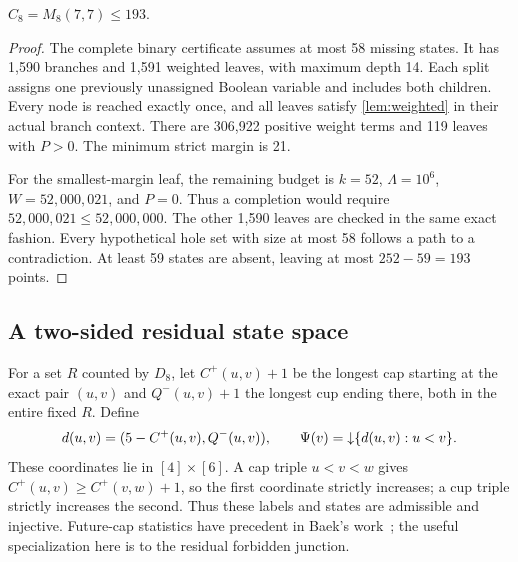 \begin{proposition}\label{prop:193}
$C_8=M_8(7,7)\le193$.
\end{proposition}
\begin{proof}
The complete binary certificate assumes at most 58 missing states.
It has 1,590 branches and 1,591 weighted leaves, with maximum depth
14. Each split assigns one previously unassigned Boolean variable
and includes both children. Every node is reached exactly once, and
all leaves satisfy \cref{lem:weighted} in their actual branch context.
There are 306,922 positive weight terms and 119 leaves with $P>0$.
The minimum strict margin is 21.

For the smallest-margin leaf, the remaining budget is $k=52$,
$\Lambda=10^6$, $W=52{,}000{,}021$, and $P=0$. Thus a completion would
require $52{,}000{,}021\le52{,}000{,}000$. The other 1,590 leaves
are checked in the same exact fashion. Every hypothetical hole set
with size at most 58 follows a path to a contradiction. At least 59
states are absent, leaving at most $252-59=193$ points.
\end{proof}

\subsection{A two-sided residual state space}
For a set $R$ counted by $D_8$, let $C^+(u,v)+1$ be the longest cap
starting at the exact pair $(u,v)$ and $Q^-(u,v)+1$ the longest cup
ending there, both in the entire fixed $R$. Define
\begin{equation}\label{eq:twosided}
 d(u,v)=(5-C^+(u,v),Q^-(u,v)),\qquad
 \Psi(v)=\mathord{\downarrow}\{d(u,v):u<v\}.
\end{equation}
These coordinates lie in $[4]\times[6]$. A cap triple $u<v<w$ gives
$C^+(u,v)\ge C^+(v,w)+1$, so the first coordinate strictly increases;
a cup triple strictly increases the second. Thus these labels and
states are admissible and injective. Future-cap statistics have
precedent in Baek's work~\cite[Theorem~3.2 and Definition~3.4]{Baek};
the useful specialization here is to the residual forbidden junction.

